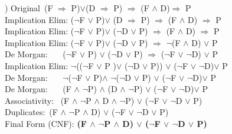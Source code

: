 \documentclass[12pt]{article}
\begin{document}
) Original\indent \indent\indent\ (F $\Rightarrow$ P)$\vee$(D $\Rightarrow$ P) $\Rightarrow$ (F $\wedge$ D)$\Rightarrow$ P\\[.4em]
\indent Implication Elim: ($\neg$F $\vee$ P)$\vee$ (D $\Rightarrow$ P) $\Rightarrow$ (F $\wedge$ D) $\Rightarrow$ P\\
\indent Implication Elim: ($\neg$F $\vee$ P)$\vee$ ($\neg$D $\vee$ P) $\Rightarrow$ (F $\wedge$ D) $\Rightarrow$ P\\
\indent Implication Elim: ($\neg$F $\vee$ P)$\vee$ ($\neg$D $\vee$ P) $\Rightarrow$ $\neg$(F $\wedge$ D) $\vee$ P\\
\indent De Morgan: \indent\ \ \ ($\neg$F $\vee$ P) $\vee$ ($\neg$D $\vee$ P) $\Rightarrow$ ($\neg$F $\vee$ $\neg$D) $\vee$ P\\
\indent Implication Elim: $\neg$(($\neg$F $\vee$ P )$\vee$ ($\neg$D $\vee$ P)) $\vee$ ($\neg$F $\vee$ $\neg$D)$\vee$ P\\
\indent De Morgan: \indent\ \ \ $\neg$($\neg$F $\vee$ P)$\wedge$ $\neg$($\neg$D $\vee$ P) $\vee$ ($\neg$F $\vee$ $\neg$D)$\vee$ P\\
\indent De Morgan: \indent\ \ \ (F $\wedge$ $\neg$P) $\wedge$ (D $\wedge$ $\neg$P) $\vee$ ($\neg$F $\vee$ $\neg$D)$\vee$ P\\
\indent Associativity: \indent\ (F $\wedge$ $\neg$P $\wedge$ D $\wedge$ $\neg$P) $\vee$ ($\neg$F $\vee$ $\neg$D $\vee$ P)\\
\indent Duplicates:\indent\indent\ (F $\wedge$ $\neg$P $\wedge$ D) $\vee$ ($\neg$F $\vee$ $\neg$D $\vee$ P)\\

\indent Final Form (CNF): \textbf{(F $\wedge$ $\neg$P $\wedge$ D) $\vee$ ($\neg$F $\vee$ $\neg$D $\vee$ P)}\\
\end{document}

